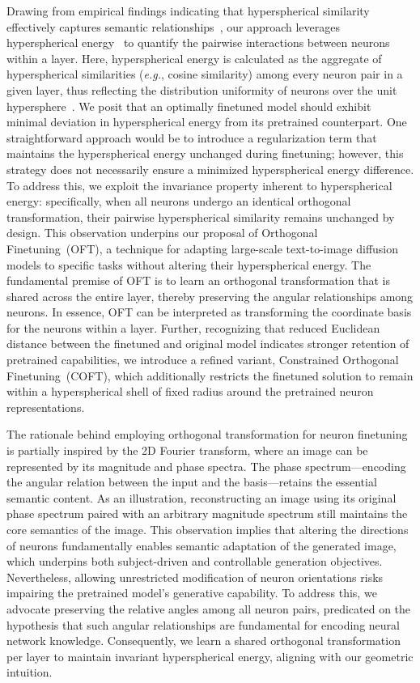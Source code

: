 Drawing from empirical findings indicating that hyperspherical similarity effectively captures semantic relationships~\cite{liu2017deep,liu2018decoupled,chen2020angular}, our approach leverages hyperspherical energy~\cite{liu2018learning} to quantify the pairwise interactions between neurons within a layer. Here, hyperspherical energy is calculated as the aggregate of hyperspherical similarities (\emph{e.g.}, cosine similarity) among every neuron pair in a given layer, thus reflecting the distribution uniformity of neurons over the unit hypersphere~\cite{liu2021learning}. We posit that an optimally finetuned model should exhibit minimal deviation in hyperspherical energy from its pretrained counterpart. One straightforward approach would be to introduce a regularization term that maintains the hyperspherical energy unchanged during finetuning; however, this strategy does not necessarily ensure a minimized hyperspherical energy difference. To address this, we exploit the invariance property inherent to hyperspherical energy: specifically, when all neurons undergo an identical orthogonal transformation, their pairwise hyperspherical similarity remains unchanged by design. This observation underpins our proposal of Orthogonal Finetuning~(OFT), a technique for adapting large-scale text-to-image diffusion models to specific tasks without altering their hyperspherical energy. The fundamental premise of OFT is to learn an orthogonal transformation that is shared across the entire layer, thereby preserving the angular relationships among neurons. In essence, OFT can be interpreted as transforming the coordinate basis for the neurons within a layer. Further, recognizing that reduced Euclidean distance between the finetuned and original model indicates stronger retention of pretrained capabilities, we introduce a refined variant, Constrained Orthogonal Finetuning~(COFT), which additionally restricts the finetuned solution to remain within a hyperspherical shell of fixed radius around the pretrained neuron representations.

The rationale behind employing orthogonal transformation for neuron finetuning is partially inspired by the 2D Fourier transform, where an image can be represented by its magnitude and phase spectra. The phase spectrum—encoding the angular relation between the input and the basis—retains the essential semantic content. As an illustration, reconstructing an image using its original phase spectrum paired with an arbitrary magnitude spectrum still maintains the core semantics of the image. This observation implies that altering the directions of neurons fundamentally enables semantic adaptation of the generated image, which underpins both subject-driven and controllable generation objectives. Nevertheless, allowing unrestricted modification of neuron orientations risks impairing the pretrained model's generative capability. To address this, we advocate preserving the relative angles among all neuron pairs, predicated on the hypothesis that such angular relationships are fundamental for encoding neural network knowledge. Consequently, we learn a shared orthogonal transformation per layer to maintain invariant hyperspherical energy, aligning with our geometric intuition.

